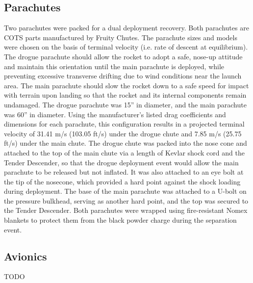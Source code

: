 \subsection{Parachutes} %
\label{sub:parachutes}
Two parachutes were packed for a dual deployment recovery. Both parachutes are COTS parts manufactured by Fruity Chutes. The parachute sizes and models were chosen on the basis of terminal velocity (i.e. rate of descent at equilibrium). The drogue parachute should allow the rocket to adopt a safe, nose-up attitude and maintain this orientation until the main parachute is deployed, while preventing excessive transverse drifting due to wind conditions near the launch area. The main parachute should slow the rocket down to a safe speed for impact with terrain upon landing so that the rocket and its internal components remain undamaged. The drogue parachute was 15” in diameter, and the main parachute was 60” in diameter. Using the manufacturer’s listed drag coefficients and dimensions for each parachute, this configuration results in a projected terminal velocity of 31.41 m/s (103.05 ft/s) under the drogue chute and 7.85 m/s (25.75 ft/s) under the main chute.
\newline\newline
The drogue chute was packed into the nose cone and attached to the top of the main chute via a length of Kevlar shock cord and the Tender Descender, so that the drogue deployment event would allow the main parachute to be released but not inflated. It was also attached to an eye bolt at the tip of the nosecone, which provided a hard point against the shock loading during deployment. The base of the main parachute was attached to a U-bolt on the pressure bulkhead, serving as another hard point, and the top was secured to the Tender Descender. Both parachutes were wrapped using fire-resistant Nomex blankets to protect them from the black powder charge during the separation event.
\subsection{Avionics} %
\label{sub:avionics}
TODO